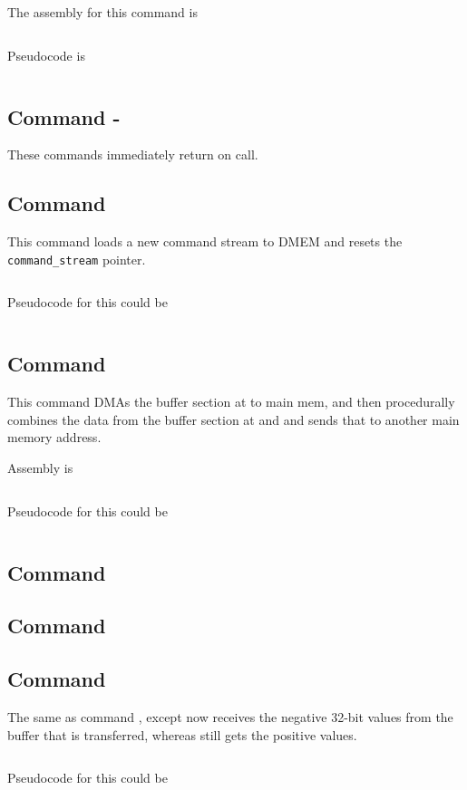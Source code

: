 The assembly for this command is 

\inputminted[fontsize=\small]{asm}{../ucode/command_8.asm}

Pseudocode is

\inputminted{c}{../ucode/command_8.c}

\subsection{Command  - }
These commands immediately return on call.
\subsection{Command }
This command loads a new command stream to DMEM and resets the \texttt{command_stream} pointer. 

\inputminted[fontsize=\small]{asm}{../ucode/command_d.asm}

Pseudocode for this could be 

\inputminted{c}{../ucode/command_d.c}

\subsection{Command }
This command DMAs the buffer section at  to main mem, and then procedurally combines the data from the buffer section at  and  and sends that to another main memory address.

Assembly is 

\inputminted[fontsize=\small]{asm}{../ucode/command_e.asm}

Pseudocode for this could be 

\inputminted{c}{../ucode/command_e.c}


\subsection{Command }
\subsection{Command }
\subsection{Command }

The same as command , except now  receives the negative 32-bit values from the buffer that is transferred, whereas  still gets the positive values.

\inputminted[fontsize=\small]{asm}{../ucode/command_11.asm}

Pseudocode for this could be 

\inputminted{c}{../ucode/command_11.c}